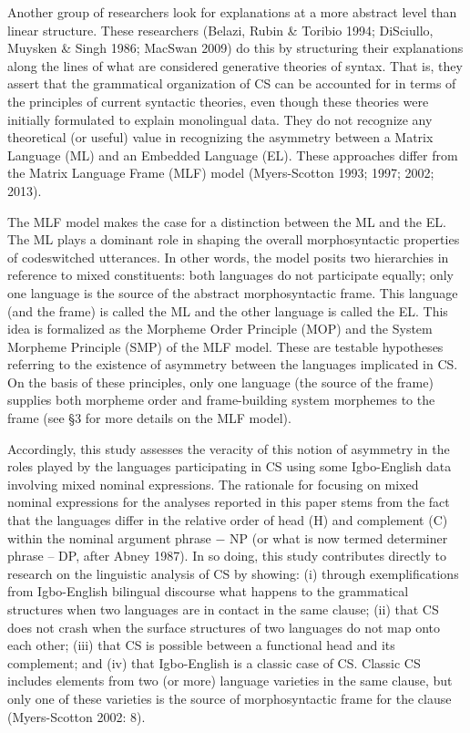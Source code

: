 \documentclass[output=paper]{langsci/langscibook}
\begin{document}
Another group of researchers look for explanations at a more abstract level than linear structure. These researchers (Belazi, Rubin \& Toribio 1994; DiSciullo, Muysken \& Singh 1986; MacSwan 2009) do this by structuring their explanations along the lines of what are considered generative theories of syntax. That is, they assert that the grammatical organization of CS can be accounted for in terms of the principles of current syntactic theories, even though these theories were initially formulated to explain monolingual data. They do not recognize any theoretical (or useful) value in recognizing the asymmetry between a Matrix Language (ML) and an Embedded Language (EL). These approaches differ from the Matrix Language Frame (MLF) model (Myers-Scotton 1993; 1997; 2002; 2013).

The MLF model makes the case for a distinction between the ML and the EL. The ML plays a dominant role in shaping the overall morphosyntactic properties of codeswitched utterances. In other words, the model posits two hierarchies in reference to mixed constituents: both languages do not participate equally; only one language is the source of the abstract morphosyntactic frame. This language (and the frame) is called the ML and the other language is called the EL. This idea is formalized as the Morpheme Order Principle (MOP) and the System Morpheme Principle (SMP) of the MLF model. These are testable hypotheses referring to the existence of asymmetry between the languages implicated in CS. On the basis of these principles, only one language (the source of the frame) supplies both morpheme order and frame-building system morphemes to the frame (see §3 for more details on the MLF model). 

Accordingly, this study assesses the veracity of this notion of asymmetry in the roles played by the languages participating in CS using some Igbo-English data involving mixed nominal expressions. The rationale for focusing on mixed nominal expressions for the analyses reported in this paper stems from the fact that the languages differ in the relative order of head (H) and complement (C) within the nominal argument phrase $-$ NP (or what is now termed determiner phrase – DP, after Abney 1987). In so doing, this study contributes directly to research on the linguistic analysis of CS by showing: (i) through exemplifications from Igbo-English bilingual discourse what happens to the grammatical structures when two languages are in contact in the same clause; (ii) that CS does not crash when the surface structures of two languages do not map onto each other; (iii) that CS is possible between a functional head and its complement; and (iv) that Igbo-English is a classic case of CS. Classic CS includes elements from two (or more) language varieties in the same clause, but only one of these varieties is the source of morphosyntactic frame for the clause (Myers-Scotton 2002: 8).
\end{document}

